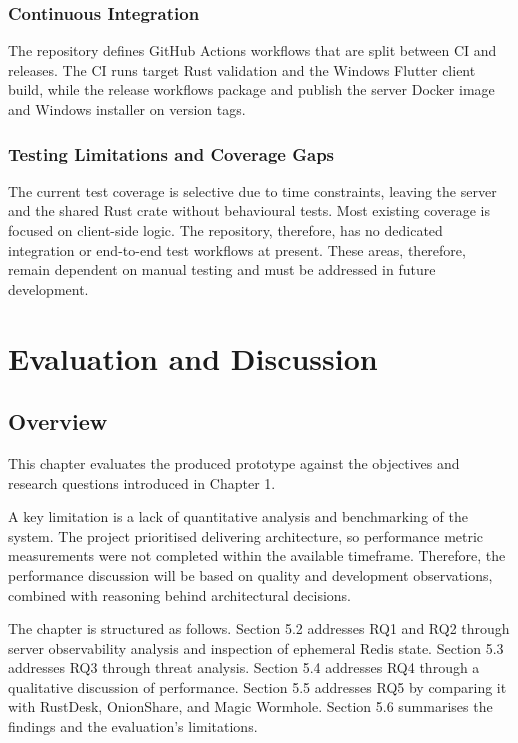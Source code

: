 \documentclass[12pt,a4paper]{article}
\begin{document}
\subsubsection{Continuous Integration}

The repository defines GitHub Actions workflows that are split between CI and releases. The CI runs target Rust validation and the Windows Flutter client build, while the release workflows package and publish the server Docker image and Windows installer on version tags.

\subsubsection{Testing Limitations and Coverage Gaps}

The current test coverage is selective due to time constraints, leaving the server and the shared Rust crate without behavioural tests. Most existing coverage is focused on client-side logic. The repository, therefore, has no dedicated integration or end-to-end test workflows at present. These areas, therefore, remain dependent on manual testing and must be addressed in future development.

\section{Evaluation and Discussion}

\subsection{Overview}

This chapter evaluates the produced prototype against the objectives and research questions introduced in Chapter 1.

A key limitation is a lack of quantitative analysis and benchmarking of the system. The project prioritised delivering architecture, so performance metric measurements were not completed within the available timeframe. Therefore, the performance discussion will be based on quality and development observations, combined with reasoning behind architectural decisions.

The chapter is structured as follows. Section 5.2 addresses RQ1 and RQ2 through server observability analysis and inspection of ephemeral Redis state. Section 5.3 addresses RQ3 through threat analysis. Section 5.4 addresses RQ4 through a qualitative discussion of performance. Section 5.5 addresses RQ5 by comparing it with RustDesk, OnionShare, and Magic Wormhole. Section 5.6 summarises the findings and the evaluation’s limitations.
\end{document}
